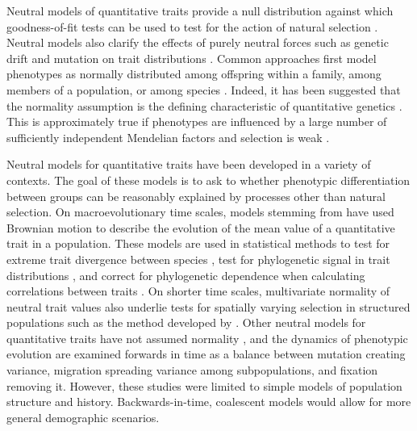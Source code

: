 Neutral models of quantitative traits provide a null distribution against which
goodness-of-fit tests can be used to test for the action of natural
selection \citep{Lande1976,Leinonen2013}. Neutral models also clarify the
effects of purely neutral forces such as genetic drift and mutation on trait
distributions \citep{Lynch1986}. Common approaches first model phenotypes as
normally distributed among offspring within a family, among members of a
population, or among species \citep{Turelli2017}. Indeed, it has been suggested
that the normality assumption is the defining characteristic of quantitative
genetics \citep{Rice2004}. This is approximately true if phenotypes are
influenced by a large number of sufficiently independent Mendelian factors
\citep{Fisher1918} and selection is weak \citep{Turelli1990}.

Neutral models for quantitative traits have been developed in a variety of
contexts. The goal of these models is to ask to whether phenotypic
differentiation between groups can be reasonably explained by processes other
than natural selection. On macroevolutionary time scales, models stemming
from \citet{Lande1976} have used Brownian motion to describe the evolution of
the mean value of a quantitative trait in a population. These models are used in
statistical methods to test for extreme trait divergence between
species \citep{Turelli1988}, test for phylogenetic signal in trait
distributions \citep{Freckleton2002}, and correct for phylogenetic dependence
when calculating correlations between traits \citep{Felsenstein1985}. On shorter
time scales, multivariate normality of neutral trait values also underlie tests
for spatially varying selection in structured populations such as the method
developed by \citet{Ovaskainen2011}. Other neutral models for quantitative
traits have not assumed normality \citep{Chakraborty1982,Lynch1986,Lande1992},
and the dynamics of phenotypic evolution are examined forwards in time as a
balance between mutation creating variance, migration spreading variance among
subpopulations, and fixation removing it. However, these studies were limited to
simple models of population structure and history. Backwards-in-time, coalescent
models would allow for more general demographic scenarios.


